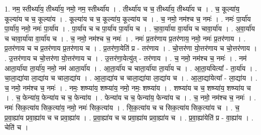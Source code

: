 \documentclass[17pt]{extarticle}
\begin{document}
1. नम॒ स्तीर्थ्या॑य॒ तीर्थ्या॑य॒ नमो॒ नम॒ स्तीर्थ्या॑य । . तीर्थ्या॑य च च॒ तीर्थ्या॑य॒ तीर्थ्या॑य च । . च॒ कूल्या॑य॒ कूल्या॑य च च॒ कूल्या॑य । . कूल्या॑य च च॒ कूल्या॑य॒ कूल्या॑य च । . च॒ नमो॒ नम॑श्च च॒ नमः॑ । . नमः॑ पा॒र्या॑य पा॒र्या॑य॒ नमो॒ नमः॑ पा॒र्या॑य । . पा॒र्या॑य च च पा॒र्या॑य पा॒र्या॑य च । . चा॒वा॒र्या॑या वा॒र्या॑य च चावा॒र्या॑य । . अ॒वा॒र्या॑य च चावा॒र्या॑या वा॒र्या॑य च । . च॒ नमो॒ नम॑श्च च॒ नमः॑ । . नमः॑ प्र॒तर॑णाय प्र॒तर॑णाय॒ नमो॒ नमः॑ प्र॒तर॑णाय । . प्र॒तर॑णाय च च प्र॒तर॑णाय प्र॒तर॑णाय च । . प्र॒तर॑णा॒येति॑ प्र - तर॑णाय । . चो॒त्तर॑णा यो॒त्तर॑णाय च चो॒त्तर॑णाय । . उ॒त्तर॑णाय च चो॒त्तर॑णा यो॒त्तर॑णाय च । . उ॒त्तर॑णा॒येत्यु॑त् - तर॑णाय । . च॒ नमो॒ नम॑श्च च॒ नमः॑ । . नम॑ आता॒र्या॑या ता॒र्या॑य॒ नमो॒ नम॑ आता॒र्या॑य । . आ॒ता॒र्या॑य च चाता॒र्या॑या ता॒र्या॑य च । . आ॒ता॒र्या॑येत्या᳚ - ता॒र्या॑य । . चा॒ला॒द्या॑या ला॒द्या॑य च चाला॒द्या॑य । . आ॒ला॒द्या॑य च चाला॒द्या॑या ला॒द्या॑य च । . आ॒ला॒द्या॑येत्या᳚ - ला॒द्या॑य । . च॒ नमो॒ नम॑श्च च॒ नमः॑ । . नमः॒ शष्प्या॑य॒ शष्प्या॑य॒ नमो॒ नमः॒ शष्प्या॑य । . शष्प्या॑य च च॒ शष्प्या॑य॒ शष्प्या॑य च । . च॒ फेन्या॑य॒ फेन्या॑य च च॒ फेन्या॑य । . फेन्या॑य च च॒ फेन्या॑य॒ फेन्या॑य च । . च॒ नमो॒ नम॑श्च च॒ नमः॑ । . नमः॑ सिक॒त्या॑य सिक॒त्या॑य॒ नमो॒ नमः॑ सिक॒त्या॑य । . सि॒क॒त्या॑य च च सिक॒त्या॑य सिक॒त्या॑य च । . च॒ प्र॒वा॒ह्या॑य प्रवा॒ह्या॑य च च प्रवा॒ह्या॑य । . प्र॒वा॒ह्या॑य च च प्रवा॒ह्या॑य प्रवा॒ह्या॑य च । . प्र॒वा॒ह्या॑येति॑ प्र - वा॒ह्या॑य । . चेति॑ च । \newline
\end{document}
